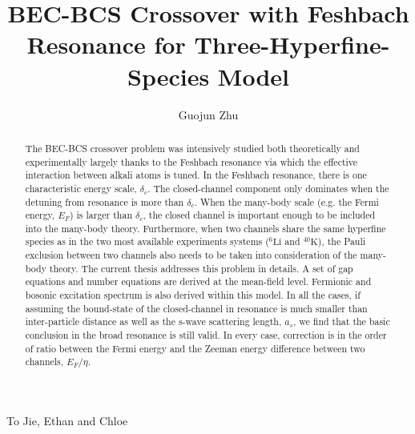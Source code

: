 \documentclass[edeposit,fullpage,prequest]{uiucthesis2009}
\begin{document}
\title{BEC-BCS Crossover with Feshbach Resonance for Three-Hyperfine-Species Model}
\author{Guojun Zhu}
\phdthesis
{}
\maketitle

\frontmatter

%
\begin{abstract}
The BEC-BCS crossover problem was intensively studied both theoretically and experimentally largely thanks to the Feshbach resonance via which the effective interaction between alkali atoms is tuned.  In the Feshbach resonance, there is one characteristic energy scale, $\delta_c$. The closed-channel component only dominates when the detuning from resonance is more than $\delta_c$.  When the many-body scale (e.g. the Fermi energy, $E_{F}$) is larger than $\delta_c$, the closed channel is important enough to be included into the many-body theory.  Furthermore, when two channels share the same hyperfine species as in the two most available experiments systems (${}^6\text{Li}$ and ${}^{40}\text{K}$), the Pauli exclusion between two channels also needs to be taken into consideration of the many-body theory.  The current  thesis addresses this problem in details. A set of gap equations and number equations  are derived at the mean-field level.  Fermionic and bosonic excitation spectrum is also derived within this model.  In all the cases, if assuming the bound-state of the closed-channel in resonance is much smaller than inter-particle distance as well as the s-wave scattering length, $a_s$, we find that  the basic conclusion in the broad resonance is still valid. In every case, correction is  in the  order of ratio between the Fermi energy and the Zeeman energy difference between two channels, $E_F/\eta$.  
\end{abstract}

\begin{dedication}
To Jie, Ethan and Chloe
\end{dedication}
\end{document}
